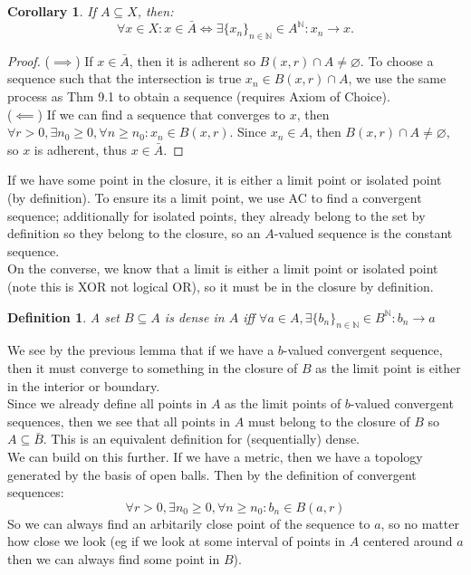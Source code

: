 \documentclass{article}
\newtheorem{defn}{Definition}[section]
\newtheorem{cor}{Corollary}[section]
\begin{document}
\medskip
\begin{cor}
If $A \subseteq X$, then:
\begin{equation*}
    \forall x \in X: x \in \bar{A} \iff \exists \{x_n\}_{n \in \mathbb{N}} \in A^\mathbb{N}: x_n \xrightarrow{} x.
\end{equation*}
\end{cor}
\begin{proof}
($\implies$) If $x \in \bar{A}$, then it is adherent so $B(x, r) \cap A \neq \varnothing$. To choose a sequence such that the intersection is true $x_n \in B(x, r) \cap A$, we use the same process as Thm 9.1 to obtain a sequence (requires Axiom of Choice).\\

($\impliedby$) If we can find a sequence that converges to $x$, then $\forall r > 0, \exists n_0 \geqslant 0, \forall n \geqslant n_0: x_n \in B(x, r)$. Since $x_n \in A$, then $B(x, r) \cap A \neq \varnothing$, so $x$ is adherent, thus $x \in \bar{A}$.
\end{proof}
If we have some point in the closure, it is either a limit point or isolated point (by definition). To ensure its a limit point, we use AC to find a convergent sequence; additionally for isolated points, they already belong to the set by definition so they belong to the closure, so an $A$-valued sequence is the constant sequence.\\

On the converse, we know that a limit is either a limit point or isolated point (note this is XOR not logical OR), so it must be in the closure by definition.\\

\medskip
\begin{defn}
A set $B \subseteq A$ is dense in $A$ iff $\forall a \in A, \exists \{b_n\}_{n \in \mathbb{N}} \in B^\mathbb{N}: b_n \xrightarrow{} a$
\end{defn}
We see by the previous lemma that if we have a $b$-valued convergent sequence, then it must converge to something in the closure of $B$ as the limit point is either in the interior or boundary.\\

Since we already define all points in $A$ as the limit points of $b$-valued convergent sequences, then we see that all points in $A$ must belong to the closure of $B$ so $A \subseteq \bar{B}$. This is an equivalent definition for (sequentially) dense.\\

We can build on this further. If we have a metric, then we have a topology generated by the basis of open balls. Then by the definition of convergent sequences:
\begin{equation*}
    \forall r > 0, \exists n_0 \geqslant 0, \forall n \geqslant n_0: b_n \in B(a, r)
\end{equation*}
So we can always find an arbitarily close point of the sequence to $a$, so no matter how close we look (eg if we look at some interval of points in $A$ centered around $a$ then we can always find some point in $B$).
\end{document}
